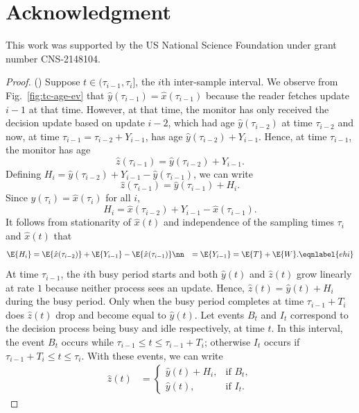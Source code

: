 \documentclass[conference, 10pt]{IEEEtran}
\newcommand{\maxage}{\hat{x}}
\newcommand{\dpage}{\hat{y}}
\newcommand{\monage}{\hat{z}}
\begin{document}
\section*{Acknowledgment}
This work was supported by the US National Science Foundation under grant number CNS-2148104.





\appendix


\begin{proof} ()
     Suppose $t\in (\tau_{i-1},\tau_i]$, the $i$th inter-sample interval. 
    We observe from Fig.~\ref{fig:tc-age-ev} that $\dpage(\tau_{i-1})=\maxage(\tau_{i-1})$ because the reader fetches update $i-1$ at that time.  However, at that time, the monitor has only received the decision update based on 
    update $i-2$, which had age $\dpage(\tau_{i-2})$ at time $\tau_{i-2}$ and now, at time $\tau_{i-1}=\tau_{i-2}+Y_{i-1}$, has age $\dpage(\tau_{i-2})+Y_{i-1}$.  Hence, at time $\tau_{i-1}$, the monitor has age
     \begin{equation}
       \monage(\tau_{i-1})=\dpage(\tau_{i-2})+Y_{i-1}.
       \end{equation}
       Defining $H_i=\dpage(\tau_{i-2}) + Y_{i-1} - \dpage(\tau_{i-1})$, we can write       
\begin{equation}
\monage(\tau_{i-1})   =\dpage(\tau_{i-1})+ H_i.
\end{equation}
Since $\dpage(\tau_i)=\maxage(\tau_i)$ for all $i$, \begin{equation}
 H_i=\maxage(\tau_{i-2}) + Y_{i-1} - \maxage(\tau_{i-1}).
\end{equation}
It follows from  stationarity of $\maxage(t)$ and independence of the sampling times $\tau_i$  and $\maxage(t)$ that
\begin{align}
    \E{H_i}&=\E{\maxage(\tau_{i-2})} + \E{Y_{i-1}} - \E{\maxage(\tau_{i-1})}\nn
    &= \E{Y_{i-1}}=\E{T}+\E{W}.\eqnlabel{ehi} 
\end{align}
At time $\tau_{i-1}$, the $i$th busy period starts and both $\dpage(t)$ and $\monage(t)$ grow linearly at rate $1$ because neither process sees an update. Hence, $\monage(t)   =\dpage(t)+ H_i$ during the busy period. Only when the busy period completes at time $\tau_{i-1}+T_i$ does $\monage(t)$ drop and become equal to $\dpage(t)$. 
Let events $B_t$ and $I_t$ correspond to the decision process being busy and idle respectively, at time $t$.
In this interval, the event $B_t$ occurs while $\tau_{i-1} \leq t \leq \tau_{i-1} + T_i$; otherwise $I_t$ occurs if $\tau_{i-1} + T_i \leq t \leq \tau_{i}$. With these events, we can write
\begin{align}
        \monage(t) &= \begin{cases}
            \dpage(t) + H_i, & \text{if $B_t$}, \\
            \dpage(t), & \text{if $I_t$}.
        \end{cases}
    \end{align}


\end{proof}
\end{document}
